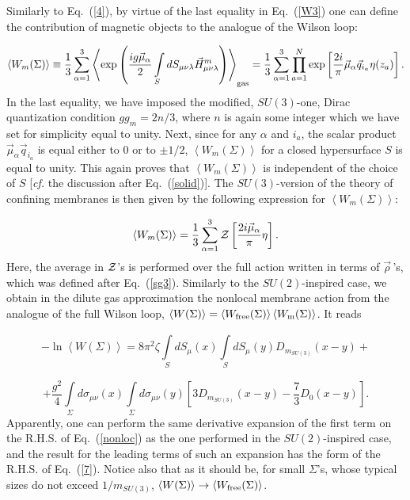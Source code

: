 \documentclass[a4paper,12pt]{article}
\begin{document}
Similarly to Eq.~(\ref{4}), by virtue of the last equality in Eq.~(\ref{W3}) one can define the contribution of magnetic objects 
to the analogue of the Wilson loop:

$$\left<W_m(\Sigma)\right>\equiv
\frac13\sum\limits_{\alpha=1}^{3}\left<\exp\left(\frac{ig\vec\mu_\alpha}{2}
\int\limits_{S}^{} dS_{\mu\nu\lambda}\vec H_{\mu\nu\lambda}^m\right)\right>_{\rm gas}=
\frac13\sum\limits_{\alpha=1}^{3}\prod\limits_{a=1}^{N}\exp\left[\frac{2i}{\pi}\vec\mu_\alpha\vec q_{i_a}\eta(z_a)\right].$$
In the last equality, we have imposed the modified, $SU(3)$-one, Dirac quantization condition $gg_m=2n/3$, where $n$ is again some
integer which we have set for simplicity equal to unity. Next, since for any $\alpha$ and $i_a$, the scalar product $\vec\mu_\alpha\vec q_{i_a}$
is equal either to $0$ or to $\pm 1/2$,  
$\left<W_m(\Sigma)\right>$ for a closed hypersurface $S$ is equal to unity. 
This again proves that $\left<W_m(\Sigma)\right>$
is independent of the choice of $S$ [{\it cf.} the discussion after Eq.~(\ref{solid})].
The $SU(3)$-version of the theory of confining membranes is then given by the following expression for $\left<W_m(\Sigma)\right>$:

$$\left<W_m(\Sigma)\right>=\frac13\sum\limits_{\alpha=1}^{3}{\cal Z}\left[\frac{2i\vec\mu_\alpha}{\pi}\eta\right].$$
Here, the average in ${\cal Z}$'s is performed over the full action written in terms of $\vec\rho{\,}$'s, which was defined after Eq.~(\ref{sg3}).
Similarly to the $SU(2)$-inspired case, we obtain in the dilute gas approximation the nonlocal membrane action from the 
analogue of the full Wilson loop, $\left<W(\Sigma)\right>=\left<W_{\rm free}(\Sigma)\right>
\left<W_{\rm m}(\Sigma)\right>$. It reads

$$-\ln\left<W(\Sigma)\right>=8\pi^2\zeta\int\limits_{S}^{}dS_\mu(x)\int\limits_{S}^{}dS_\mu(y)D_{m_{SU(3)}}(x-y)+$$

\begin{equation}
\label{nonloc}
+\frac{g^2}{4}\int\limits_{\Sigma}^{}d\sigma_{\mu\nu}(x)\int\limits_{\Sigma}^{}d\sigma_{\mu\nu}(y)
\left[3D_{m_{SU(3)}}(x-y)-\frac73D_0(x-y)\right].
\end{equation}
Apparently, one can perform the same derivative expansion of the first term on the R.H.S. of Eq.~(\ref{nonloc}) as the one 
performed in the $SU(2)$-inspired case, and the result for the leading terms of such an expansion 
has the form of the R.H.S. of Eq.~(\ref{7}).
Notice also that as it should be, for small $\Sigma$'s, whose typical sizes do not exceed $1/m_{SU(3)}$, 
$\left<W(\Sigma)\right>\to\left<W_{\rm free}(\Sigma)\right>$.
\end{document}
